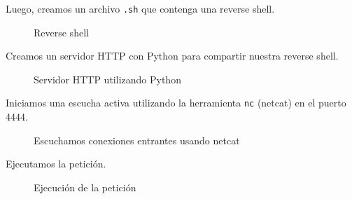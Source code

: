 \documentclass[a4paper]{article} %
\begin{document}
    \vspace{0.3cm}

    Luego, creamos un archivo \texttt{.sh} que contenga una reverse shell.

    \begin{figure}[h]
	\centering
	\setlength{\fboxrule}{0.5pt}
	\caption{Reverse shell}
    \end{figure}

    Creamos un servidor HTTP con Python para compartir nuestra reverse shell.

    \begin{figure}[h]
	\centering
	\setlength{\fboxrule}{0.5pt}
	\caption{Servidor HTTP utilizando Python}
    \end{figure}

    \clearpage

    Iniciamos una escucha activa utilizando la herramienta \texttt{nc} (netcat) en el puerto 4444.

    \begin{figure}[h]
	\centering
	\setlength{\fboxrule}{0.5pt}
	\caption{Escuchamos conexiones entrantes usando netcat}
    \end{figure}

    Ejecutamos la petición.

    \begin{figure}[h]
	\centering
	\setlength{\fboxrule}{0.5pt}
	\caption{Ejecución de la petición}
    \end{figure}
\end{document}

